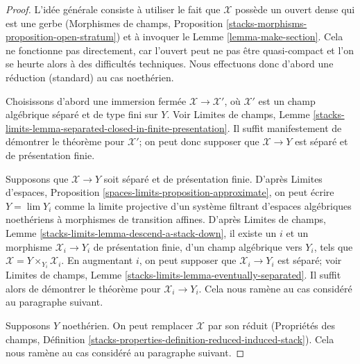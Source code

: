 \begin{proof}
L'idée générale consiste à utiliser le fait que $\mathcal{X}$ possède un ouvert dense
qui est une gerbe (Morphismes de champs, Proposition
\ref{stacks-morphisms-proposition-open-stratum})
et à invoquer le Lemme \ref{lemma-make-section}.
Cela ne fonctionne pas directement, car l'ouvert peut ne pas être
quasi-compact et l'on se heurte alors à des difficultés techniques. Nous effectuons donc
d'abord une réduction (standard) au cas noethérien.

\medskip\noindent
Choisissons d'abord une immersion fermée
$\mathcal{X} \to \mathcal{X}'$, où $\mathcal{X}'$
est un champ algébrique séparé et de type fini sur $Y$.
Voir Limites de champs, Lemme
\ref{stacks-limits-lemma-separated-closed-in-finite-presentation}.
Il suffit manifestement de démontrer le théorème pour
$\mathcal{X}'$; on peut donc supposer que $\mathcal{X} \to Y$
est séparé et de présentation finie.

\medskip\noindent
Supposons que $\mathcal{X} \to Y$ soit séparé et de présentation finie.
D'après Limites d'espaces, Proposition \ref{spaces-limits-proposition-approximate},
on peut écrire $Y = \lim Y_i$ comme la limite projective d'un système filtrant
d'espaces algébriques noethériens à morphismes de transition affines.
D'après Limites de champs, Lemme \ref{stacks-limits-lemma-descend-a-stack-down},
il existe un $i$ et un morphisme $\mathcal{X}_i \to Y_i$ de présentation finie,
d'un champ algébrique vers $Y_i$, tels que
$\mathcal{X} = Y \times_{Y_i} \mathcal{X}_i$.
En augmentant $i$, on peut supposer que $\mathcal{X}_i \to Y_i$
est séparé; voir Limites de champs, Lemme
\ref{stacks-limits-lemma-eventually-separated}.
Il suffit alors de démontrer le théorème
pour $\mathcal{X}_i \to Y_i$. Cela nous ramène au cas considéré
au paragraphe suivant.

\medskip\noindent
Supposons $Y$ noethérien. On peut remplacer $\mathcal{X}$ par son
réduit (Propriétés des champs, Définition
\ref{stacks-properties-definition-reduced-induced-stack}).
Cela nous ramène au cas considéré
au paragraphe suivant.


\end{proof}
